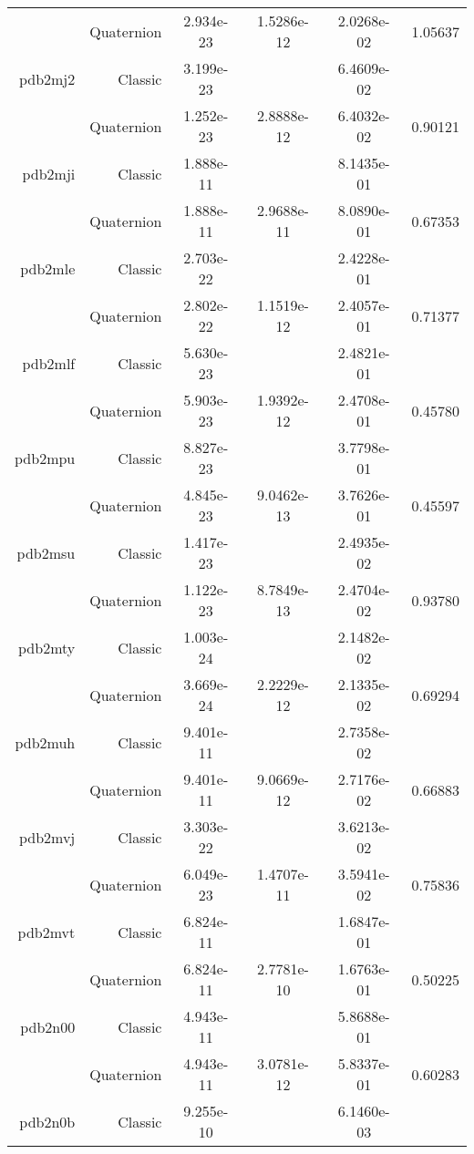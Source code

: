 \begin{xltabular}{\textwidth}{r|rS[table-format=1.3e+2]S[table-format=1.4e+2]S[table-format=1.4e+2]S[table-format=-1.5]}
& Quaternion & 2.934e-23 & 1.5286e-12 & 2.0268e-02 & 1.05637\\  \addlinespace
pdb2mj2 & Classic & 3.199e-23 &  & 6.4609e-02 & \\
& Quaternion & 1.252e-23 & 2.8888e-12 & 6.4032e-02 & 0.90121\\  \addlinespace
pdb2mji & Classic & 1.888e-11 &  & 8.1435e-01 & \\
& Quaternion & 1.888e-11 & 2.9688e-11 & 8.0890e-01 & 0.67353\\  \addlinespace
pdb2mle & Classic & 2.703e-22 &  & 2.4228e-01 & \\
& Quaternion & 2.802e-22 & 1.1519e-12 & 2.4057e-01 & 0.71377\\  \addlinespace
pdb2mlf & Classic & 5.630e-23 &  & 2.4821e-01 & \\
& Quaternion & 5.903e-23 & 1.9392e-12 & 2.4708e-01 & 0.45780\\  \addlinespace
pdb2mpu & Classic & 8.827e-23 &  & 3.7798e-01 & \\
& Quaternion & 4.845e-23 & 9.0462e-13 & 3.7626e-01 & 0.45597\\  \addlinespace
pdb2msu & Classic & 1.417e-23 &  & 2.4935e-02 & \\
& Quaternion & 1.122e-23 & 8.7849e-13 & 2.4704e-02 & 0.93780\\  \addlinespace
pdb2mty & Classic & 1.003e-24 &  & 2.1482e-02 & \\
& Quaternion & 3.669e-24 & 2.2229e-12 & 2.1335e-02 & 0.69294\\  \addlinespace
pdb2muh & Classic & 9.401e-11 &  & 2.7358e-02 & \\
& Quaternion & 9.401e-11 & 9.0669e-12 & 2.7176e-02 & 0.66883\\  \addlinespace
pdb2mvj & Classic & 3.303e-22 &  & 3.6213e-02 & \\
& Quaternion & 6.049e-23 & 1.4707e-11 & 3.5941e-02 & 0.75836\\  \addlinespace
pdb2mvt & Classic & 6.824e-11 &  & 1.6847e-01 & \\
& Quaternion & 6.824e-11 & 2.7781e-10 & 1.6763e-01 & 0.50225\\  \addlinespace
pdb2n00 & Classic & 4.943e-11 &  & 5.8688e-01 & \\
& Quaternion & 4.943e-11 & 3.0781e-12 & 5.8337e-01 & 0.60283\\  \addlinespace
pdb2n0b & Classic & 9.255e-10 &  & 6.1460e-03 & \\

\end{xltabular}
